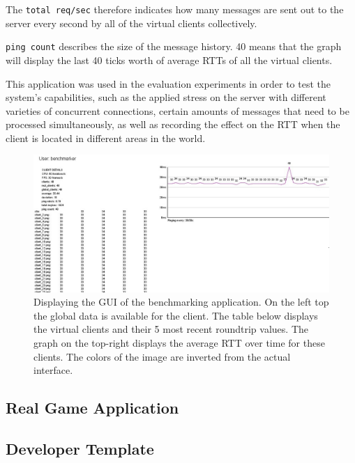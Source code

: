 \documentclass[bsc,frontabs,twoside,singlespacing,parskip,deptreport]{infthesis}     %
\begin{document}
The \texttt{total req/sec} therefore indicates how many messages are sent out to the server every second by all of the virtual clients collectively.

\texttt{ping count} describes the size of the message history. 40 means that the graph will display the last 40 ticks worth of average RTTs of all the virtual clients.

This application was used in the evaluation experiments in order to test the system's capabilities, such as the applied stress on the server with different varieties of concurrent connections, certain amounts of messages that need to be processed simultaneously, as well as recording the effect on the RTT when the client is located in different areas in the world.

\begin{figure}
\centering
\includegraphics[scale=0.4]{images/benchmarker.jpg}
\caption{Displaying the GUI of the benchmarking application. On the left top the global data is available for the client. The table below displays the virtual clients and their 5 most recent roundtrip values. The graph on the top-right displays the average RTT over time for these clients. The colors of the image are inverted from the actual interface.}
\label{fig:benchmark_gui}
\vspace{1em}
\end{figure}

\subsection{Real Game Application}
\subsection{Developer Template}
\end{document}
